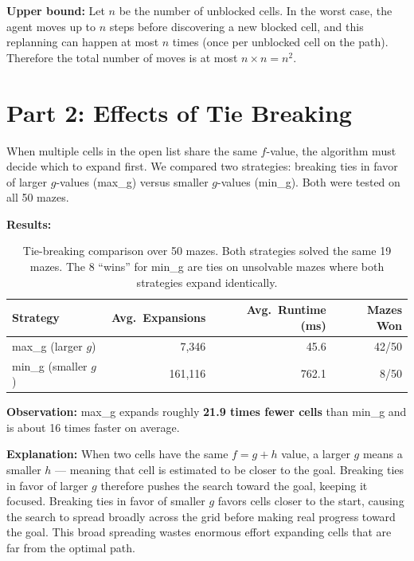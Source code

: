 \documentclass[12pt]{article}
\begin{document}
\textbf{Upper bound:} Let $n$ be the number of unblocked cells. In the worst case, the agent moves up to $n$ steps before discovering a new blocked cell, and this replanning can happen at most $n$ times (once per unblocked cell on the path). Therefore the total number of moves is at most $n \times n = n^2$.

\section*{Part 2: Effects of Tie Breaking}

When multiple cells in the open list share the same $f$-value, the algorithm must decide which to expand first. We compared two strategies: breaking ties in favor of larger $g$-values (max\_g) versus smaller $g$-values (min\_g). Both were tested on all 50 mazes.

\textbf{Results:}

\begin{table}[H]
\centering
\begin{tabular}{lrrr}
\toprule
\textbf{Strategy} & \textbf{Avg.\ Expansions} & \textbf{Avg.\ Runtime (ms)} & \textbf{Mazes Won} \\
\midrule
max\_g (larger $g$) & 7,346 & 45.6 & 42/50 \\
min\_g (smaller $g$) & 161,116 & 762.1 & 8/50 \\
\bottomrule
\end{tabular}
\caption{Tie-breaking comparison over 50 mazes. Both strategies solved the same 19 mazes. The 8 ``wins'' for min\_g are ties on unsolvable mazes where both strategies expand identically.}
\end{table}

\textbf{Observation:} max\_g expands roughly \textbf{21.9 times fewer cells} than min\_g and is about 16 times faster on average.

\textbf{Explanation:} When two cells have the same $f = g + h$ value, a larger $g$ means a smaller $h$ --- meaning that cell is estimated to be closer to the goal. Breaking ties in favor of larger $g$ therefore pushes the search toward the goal, keeping it focused. Breaking ties in favor of smaller $g$ favors cells closer to the start, causing the search to spread broadly across the grid before making real progress toward the goal. This broad spreading wastes enormous effort expanding cells that are far from the optimal path.

\end{document}
